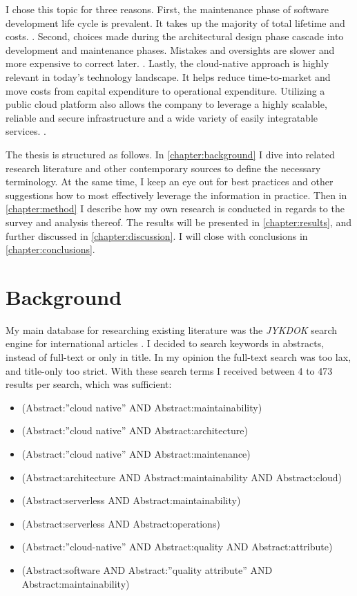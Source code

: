 \documentclass[utf8,english]{gradu3}
\begin{document}
I chose this topic for three reasons. First, the maintenance phase of software
development life cycle is prevalent. It takes up the majority of total lifetime
and costs. \parencite{Bass1998}. Second, choices made during the architectural
design phase cascade into development and maintenance phases. Mistakes and
oversights are slower and more expensive to correct later.
\parencites{Bass1998}{Mumtaz2021}. Lastly, the cloud-native approach is highly
relevant in today's technology landscape. It helps reduce time-to-market and
move costs from capital expenditure to operational expenditure. Utilizing a
public cloud platform also allows the company to leverage a highly scalable,
reliable and secure infrastructure and a wide variety of easily integratable
services. \parencite{Microsoft2022-CNA}.

The thesis is structured as follows. In \autoref{chapter:background} I dive into
related research literature and other contemporary sources to define the
necessary terminology. At the same time, I keep an eye out for best practices
and other suggestions how to most effectively leverage the information in
practice.  Then in \autoref{chapter:method} I describe how my own research is
conducted in regards to the survey and analysis thereof.  The results will be
presented in \autoref{chapter:results}, and further discussed in
\autoref{chapter:discussion}. I will close with conclusions in
\autoref{chapter:conclusions}.


\chapter{Background}
\label{chapter:background}

My main database for researching existing literature was the \textit{JYKDOK} search
engine for international articles \parencite{JYKDOK}.
I decided to search keywords in abstracts, instead of full-text or only in title.
In my opinion the full-text search was too lax, and title-only too strict.
With these search terms I received between 4 to 473 results per search, which
was sufficient:
\begin{itemize}
  \item (Abstract:''cloud native'' AND Abstract:maintainability)
  \item (Abstract:''cloud native'' AND Abstract:architecture)
  \item (Abstract:''cloud native'' AND Abstract:maintenance)
  \item (Abstract:architecture AND Abstract:maintainability AND Abstract:cloud)
  \item (Abstract:serverless AND Abstract:maintainability)
  \item (Abstract:serverless AND Abstract:operations)
  \item (Abstract:''cloud-native'' AND Abstract:quality AND Abstract:attribute)
  \item (Abstract:software AND Abstract:''quality attribute'' AND Abstract:maintainability)
\end{itemize}
\end{document}
